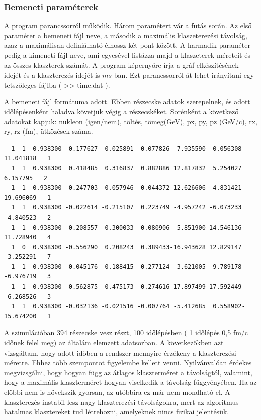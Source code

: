 \documentclass[a4paper,12pt]{article}
\begin{document}
\subsubsection{ Bemeneti paraméterek}
\par A program parancssorról működik.  Három paramétert vár a futás során. Az első paraméter a bemeneti fájl neve, a második a maximális 
klaszeterezési távolság, azaz a maximálisan definiálható élhossz két pont között. A harmadik paraméter pedig a kimeneti fájl neve, ami
egyesével listázza majd a klaszeterek méreteit és az összes klaszterek számát. A program képernyőre írja a gráf elkészítésének idejét
és a klaszterezés idejét is $ms$-ban. Ezt parancssorról át lehet irányítani egy tetszőleges fájlba ( >> time.dat ).
\par A bemeneti fájl formátuma adott. Ebben részecske adatok szerepelnek, és adott időlépésenként haladva követjük végig a részecskéket.
Sorénként a következő adatokat kapjuk: nukleon (igen/nem), töltés, tömeg(GeV), px, py, pz (GeV/c), rx, ry, rz (fm), ütközések száma.
\begin{lstlisting}
  1  1  0.938300 -0.177627  0.025891 -0.077826 -7.935590  0.056308-11.041818   1
  1  1  0.938300  0.418485  0.316837  0.882886 12.817832  5.254027  6.157795   2
  1  1  0.938300 -0.247703  0.057946 -0.044372-12.626606  4.831421-19.696069   1
  1  1  0.938300 -0.022614 -0.215107  0.223749 -4.957242 -6.073233 -4.840523   2
  1  1  0.938300 -0.208557 -0.300033  0.080906 -5.851900-14.546136-11.728940   4
  1  0  0.938300 -0.556290  0.208243  0.389433-16.943628 12.829147 -3.252291   7
  1  1  0.938300 -0.045176 -0.188415  0.277124 -3.621005 -9.789178 -6.976719   3
  1  1  0.938300 -0.562875 -0.475173  0.274616-17.897499-17.592449 -6.268526   3
  1  1  0.938300 -0.032136 -0.021516 -0.007764 -5.412685  0.558902-15.674200   1
\end{lstlisting}
\par A szimulációban 394 részecske vesz részt, 100 időlépésben ( 1 időlépés 0,5 fm/c időnek felel meg) az általám elemzett adatsorban.
A következőkben azt vizsgáltam, hogy adott időben a rendszer mennyire érzékeny a klaszterezési méretre. Ehhez több szempontot figyelembe
kellett venni. Nyilvánvalóan érdekes megvizsgálni, hogy hogyan függ az átlagos klaszterméret a távolságtól, valamint, hogy a maximális 
klaszterméret hogyan viselkedik a távolság függvényében. Ha az előbbi nem is növekszik gyorsan, az utóbbira ez már nem mondható el. 
A klaszterezés instabil lesz nagy klaszterezési távolságokra, mert az algoritmus hatalmas klasztereket tud létrehozni, amelyeknek nincs
fizikai jelentésük. 
\end{document}
